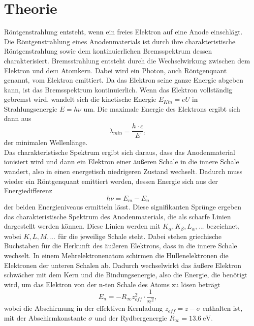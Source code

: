 \documentclass[a4paper]{scrartcl}
\begin{document}
\section{Theorie}
Röntgenstrahlung entsteht, wenn ein freies Elektron auf eine Anode einschlägt. Die Röntgenstrahlung eines Anodenmaterials ist durch ihre charakteristische Röntgenstrahlung sowie dem kontinuierlichen Bremsspektrum dessen charakterisiert. Bremsstrahlung entsteht durch die Wechselwirkung zwischen dem Elektron und dem Atomkern. Dabei wird ein Photon, auch Röntgenquant genannt, vom Elektron emittiert. Da das Elektron seine ganze Energie abgeben kann, ist das Bremsspektrum kontinuierlich. Wenn das Elektron vollständig gebremst wird, wandelt sich die kinetische Energie $E_{Kin}=eU$ in Strahlungsenergie $E=h\nu$ um. Die maximale Energie des Elektrons ergibt sich dann aus 
\begin{equation}
  \lambda_{min}=\frac{h\cdot c}{E},
  \label{1}
\end{equation}
der minimalen Wellenlänge.\\
Das charakteristische Spektrum ergibt sich daraus, dass das Anodenmaterial ionisiert wird und dann ein Elektron einer äußeren Schale in die innere Schale wandert, also in einen energetisch niedrigeren Zustand wechselt. Dadurch muss wieder ein Röntgenquant emittiert werden, dessen Energie sich aus der Energiedifferenz 
\begin{equation}
  h\nu=E_{m}-E_{n}
  \label{2}
\end{equation}
der beiden Energieniveaus ermitteln lässt. Diese signifikanten Sprünge ergeben das charakteristische Spektrum des Anodenmaterials, die als scharfe Linien dargestellt werden können. Diese Linien werden mit $K_{\alpha}, K_{\beta}, L_{\alpha}, ...$ bezeichnet, wobei $K,L,M,...$ für die jeweilige Schale steht. Dabei stehen griechische Buchstaben für die Herkunft des äußeren Elektrons, dass in die innere Schale wechselt. In einem Mehrelektronenatom schirmen die Hüllenelektronen die Elektronen der unteren Schalen ab. Dadurch wechselwirkt das äußere Elektron schwächer mit dem Kern und die Bindungsenergie, also die Energie, die benötigt wird, um das Elektron von der n-ten Schale des Atoms zu lösen beträgt
\begin{equation}
  E_{n}=-R_{\infty}z_{eff}^2\cdot\frac{1}{n^2},
  \label{3}
\end{equation}
wobei die Abschirmung in der effektiven Kernladung $z_{eff}=z-\sigma$ enthalten ist, mit der Abschirmkonstante $\sigma$ und der Rydbergenergie $R_{\infty}=13.6\ \si{\eV}$.\\
\end{document}

